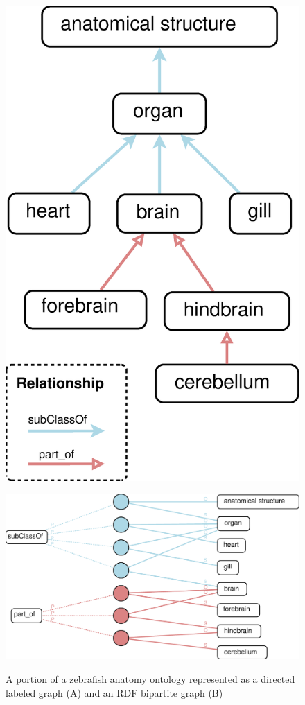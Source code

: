 \begin{figure}[tbh]
\centering
\begin{minipage}[c]{0.35\textwidth}\flushright
\includegraphics[width=.7\textwidth]{fig/DLG-bio.eps}
\end{minipage}\hfill
\begin{minipage}[c]{0.6\textwidth}\centering
\includegraphics[width=\textwidth]{fig/BG-bio.eps}\\
\end{minipage}
\caption[A comparison between the directed labeled graph and the RDF bipartite graph]{\label{fig:graphcomp-bio} A portion of a zebrafish anatomy ontology represented as a directed labeled graph (A) and an RDF bipartite graph (B)}
\end{figure}

